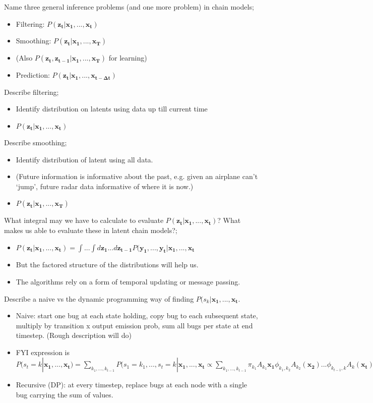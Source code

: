\documentclass{article}
\begin{document}
Name three general inference problems (and one more problem) in chain models; \begin{itemize}
    \item Filtering: $P(\mathbf{z_t|x_1,...,x_t})$
    \item Smoothing: $P(\mathbf{z_t|x_1,...,x_T})$ 
    \item (Also $P(\mathbf{z_t, z_{t-1}|x_1,...,x_T})$ for learning)
    \item Prediction: $P(\mathbf{z_t|x_1,...,x_{t-\Delta t}})$
\end{itemize}

Describe filtering; \begin{itemize}
    \item Identify distribution on latents using data up till current time
    \item 
    $P(\mathbf{z_t|x_1,...,x_t})$
\end{itemize}

Describe smoothing; \begin{itemize}
    \item Identify distribution of latent using all data. \item (Future information is informative about the past, e.g. given an airplane can't `jump', future radar data informative of where it is now.)
    \item $P(\mathbf{z_t|x_1,...,x_T})$
\end{itemize}

What integral may we have to calculate to evaluate $P(\mathbf{z_t|x_1,...,x_t})$? What makes us able to evaluate these in latent chain models?; \begin{itemize}
    \item $P(\mathbf{z_t|x_1,...,x_t}) = \int ...\int d\mathbf{z_1}...d\mathbf{z_{t-1}}P(\mathbf{y_1},...,\mathbf{y_t}|\mathbf{x_1},...,\mathbf{x_t}$
    \item But the factored structure of the distributions will help us.
    \item The algorithms rely on a form of temporal updating or message passing.
\end{itemize}

Describe a naive vs the dynamic programming way of finding $P(s_k|\mathbf{x_1,...,x_t}$. \begin{itemize}
    \item Naive: start one bug at each state holding, copy bug to each subsequent state, multiply by transition x output emission prob, sum all bugs per state at end timestep. (Rough description will do)
    \item FYI expression is $P(s_t=k|\mathbf{x_1,...,x_t})=\sum_{k_1, ..., k_{t-1}}P(s_1=k_1,...,s_t=k|\mathbf{x_1,...,x_t}\propto\sum_{k_1,...,k_{t-1}}\pi_{k_1}A_{k_1}\mathbf{x_1}\phi_{k_1,k_2}A_{k_2}(\mathbf{x_2})...\phi_{k_{t-1},k}A_k(\mathbf{x_t})$
    \item Recursive (DP): at every timestep, replace bugs at each node with a single bug carrying the sum of values.
\end{itemize}
\end{document}
